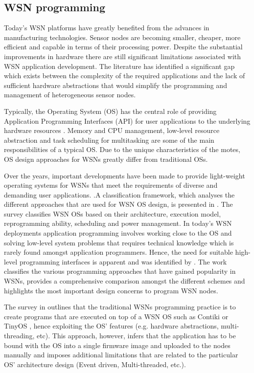 \subsection{WSN programming}
Today's WSN platforms have greatly benefited from the advances in manufacturing technologies.  Sensor nodes are becoming smaller, cheaper, more efficient and capable in terms of their processing power. Despite the substantial improvements in hardware there are still significant limitations associated with WSN application development. The literature has identified a significant gap \cite{Fok:2009:AMA:1552297.1552299,Levis:2002:MTV:635506.605407,Costa:2007:VMA:1304610.1306527,1621014} which exists between the complexity of the required applications and the lack of sufficient hardware abstractions that would simplify the programming and management of heterogeneous sensor nodes. 

Typically, the Operating System (OS) has the central role of providing Application Programming Interfaces (API) for user applications to the underlying hardware resources \cite{hailperin2007operating,Stallings:1998:OSI:272982}. Memory and CPU management, low-level resource abstraction and task scheduling for multitasking are some of the main responsibilities of a typical OS. 
Due to the unique characteristics of the motes, OS design approaches for WSNs greatly differ from traditional OSs. 

Over the years, important developments have been made to provide light-weight operating systems for WSNs that meet the requirements of diverse and demanding user applications. \cite{1367266,1630599,bhatti2005mantis,eswaran2005nano,s110605900}.A classification framework, which analyses the different approaches that are used for WSN OS design, is presented in \cite{Reddy:2009:WSN:1593545.1593549}. The survey classifies WSN OSs based on their architecture, execution model, reprogramming ability, scheduling and power management. In today's WSN deployments application programming involves working close to the OS and solving low-level system problems that requires technical knowledge which is rarely found amongst application programmers. Hence, the need for suitable high-level programming interfaces is apparent and was identified by \cite{mottola2011programming}. The work classifies the various programming approaches that have gained popularity in WSNs, provides a comprehensive comparison amongst the different schemes and highlights the most important design concerns to program WSN nodes. 

The survey in \cite{mottola2011programming} outlines that the traditional WSNs programming practice is to  create programs that are executed on top of a WSN OS such as Contiki \cite{1367266} or TinyOS \cite{1630599}, hence exploiting the OS' features (e.g. hardware abstractions, multi-threading, etc). This approach, however, infers that the application has to be bound with the OS into a single firmware image and uploaded to the nodes manually and imposes additional limitations that are related to the particular OS' architecture design (Event driven, Multi-threaded, etc.).


